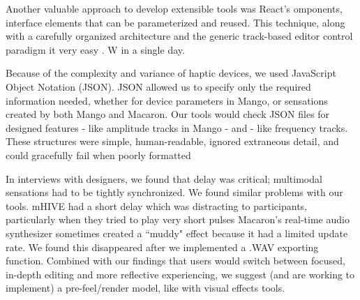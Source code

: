 Another valuable approach to develop extensible tools was React's omponents, interface elements that can be parameterized and reused.
This technique, along with a carefully organized architecture and the generic track-based editor control paradigm it very easy .
W  in a single day.


Because of the complexity and variance of haptic devices, we 
 used JavaScript Object Notation (JSON).
JSON allowed us to specify only the required information needed, whether for device parameters in Mango, or sensations created by both Mango and Macaron.
Our tools would check JSON files for designed features - like amplitude tracks in Mango - and  - like frequency tracks.
These structures were simple, human-readable, ignored extraneous detail, and could gracefully fail when poorly formatted

In interviews with designers, we found that delay was critical; multimodal sensations had to be tightly synchronized.
We found similar problems with our tools.
mHIVE had a short delay which was distracting to participants, particularly when they tried to play very short pulses\osE{;}
Macaron's real-time audio synthesizer sometimes created a ``muddy" effect because it had a limited update rate.
We found this disappeared after we implemented a .WAV exporting function.
Combined with our findings that users would switch between focused, in-depth editing and more reflective experiencing, we suggest (and are working to implement) a pre-feel/render model, like with visual effects tools.

